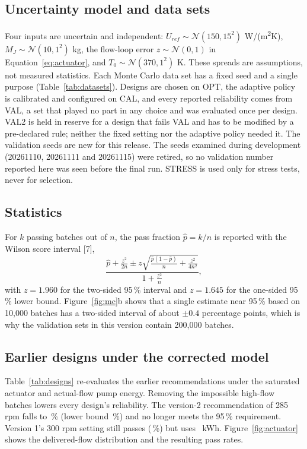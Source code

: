 \documentclass[11pt,letterpaper]{article}
\begin{document}
\subsection{Uncertainty model and data sets}
Four inputs are uncertain and independent: \(U_{ref} \sim \mathcal N(150, 15^2)\) W/(m\textsuperscript{2}K), \(M_J \sim \mathcal N(10, 1^2)\) kg, the flow-loop error \(z \sim \mathcal N(0,1)\) in Equation~\ref{eq:actuator}, and \(T_0 \sim \mathcal N(370, 1^2)\) K. These spreads are assumptions, not measured statistics. Each Monte Carlo data set has a fixed seed and a single purpose (Table~\ref{tab:datasets}). Designs are chosen on OPT, the adaptive policy is calibrated and configured on CAL, and every reported reliability comes from VAL, a set that played no part in any choice and was evaluated once per design. VAL2 is held in reserve for a design that fails VAL and has to be modified by a pre-declared rule; neither the fixed setting nor the adaptive policy needed it. The validation seeds are new for this release. The seeds examined during development (20261110, 20261111 and 20261115) were retired, so no validation number reported here was seen before the final run. STRESS is used only for stress tests, never for selection.

\begin{table}[H]
\centering
\caption{Monte Carlo data sets. Each seed is fixed and each set has one purpose.}\label{tab:datasets}
{\small}
\end{table}

\subsection{Statistics}
For \(k\) passing batches out of \(n\), the pass fraction \(\hat p = k/n\) is reported with the Wilson score interval [7],
\begin{equation}
\frac{\hat p + \frac{z^2}{2n} \pm z\sqrt{\frac{\hat p(1-\hat p)}{n} + \frac{z^2}{4n^2}}}{1 + \frac{z^2}{n}}, \label{eq:wilson}
\end{equation}
with \(z = 1.960\) for the two-sided 95\,\% interval and \(z = 1.645\) for the one-sided 95\,\% lower bound. Figure~\ref{fig:mc}b shows that a single estimate near 95\,\% based on 10{,}000 batches has a two-sided interval of about \(\pm0.4\) percentage points, which is why the validation sets in this version contain 200{,}000 batches.

\subsection{Earlier designs under the corrected model}
Table~\ref{tab:designs} re-evaluates the earlier recommendations under the saturated actuator and actual-flow pump energy. Removing the impossible high-flow batches lowers every design's reliability. The version-2 recommendation of 285 rpm falls to \vVTwoRecPass\,\% (lower bound \vVTwoRecLB\,\%) and no longer meets the 95\,\% requirement. Version 1's 300 rpm setting still passes (\vVOneRobPass\,\%) but uses \vVOneRobE\ kWh. Figure~\ref{fig:actuator} shows the delivered-flow distribution and the resulting pass rates.
\end{document}
